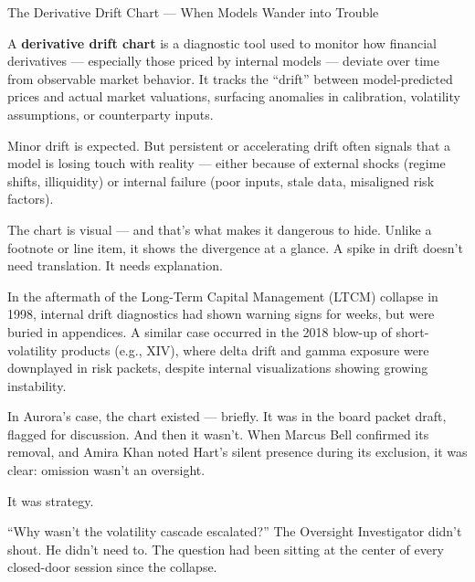 \begin{TechnicalSidebar}{The Derivative Drift Chart — When Models Wander into Trouble}

  A \textbf{derivative drift chart} is a diagnostic tool used to monitor how financial derivatives 
  — especially those priced by internal models — deviate over time from observable market behavior. 
  It tracks the ``drift'' between model-predicted prices and actual market valuations, surfacing 
  anomalies in calibration, volatility assumptions, or counterparty inputs.

  \medskip
  
  Minor drift is expected. But persistent or accelerating drift often signals that a model is 
  losing touch with reality — either because of external shocks (regime shifts, illiquidity) or 
  internal failure (poor inputs, stale data, misaligned risk factors).

  \medskip
  
  The chart is visual — and that's what makes it dangerous to hide. Unlike a footnote or line item, 
  it shows the divergence at a glance. A spike in drift doesn’t need translation. It needs explanation.

  \medskip
  
  In the aftermath of the Long-Term Capital Management (LTCM) collapse in 1998, internal drift diagnostics 
  had shown warning signs for weeks, but were buried in appendices. A similar case occurred in the 2018 
  blow-up of short-volatility products (e.g., XIV), where delta drift and gamma exposure were downplayed 
  in risk packets, despite internal visualizations showing growing instability.

  \medskip
  
  In Aurora’s case, the chart existed — briefly. It was in the board packet draft, flagged for discussion. 
  And then it wasn’t. When Marcus Bell confirmed its removal, and Amira Khan noted Hart’s silent presence 
  during its exclusion, it was clear: omission wasn’t an oversight.

  \medskip
  
  It was strategy.
  
\end{TechnicalSidebar}

\medskip

“Why wasn’t the volatility cascade escalated?”
The Oversight Investigator didn’t shout. He didn’t need to. The question had been sitting at the center of every 
closed-door session since the collapse.

